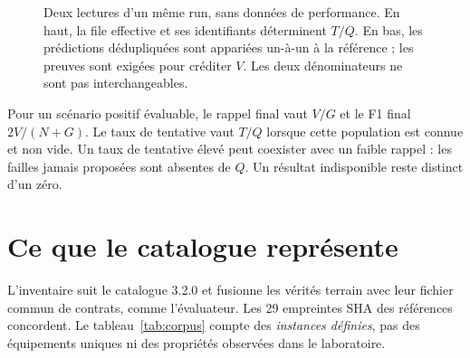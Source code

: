 \documentclass[11pt,a4paper]{article}
\begin{document}
\begin{figure}[htbp]
\centering
{}
\caption{Deux lectures d'un même run, sans données de performance. En haut, la file effective et ses identifiants déterminent $T/Q$. En bas, les prédictions dédupliquées sont appariées un-à-un à la référence ; les preuves sont exigées pour créditer $V$. Les deux dénominateurs ne sont pas interchangeables.}
\label{fig:denominators}
\end{figure}

Pour un scénario positif évaluable, le rappel final vaut $V/G$ et le F1 final $2V/(N+G)$. Le taux de tentative vaut $T/Q$ lorsque cette population est connue et non vide. Un taux de tentative élevé peut coexister avec un faible rappel : les failles jamais proposées sont absentes de $Q$. Un résultat indisponible reste distinct d'un zéro.

\section{Ce que le catalogue représente}
\label{sec:corpus}
L'inventaire suit le catalogue 3.2.0 et fusionne les vérités terrain avec leur fichier commun de contrats, comme l'évaluateur. Les 29 empreintes SHA des références concordent. Le tableau~\ref{tab:corpus} compte des \emph{instances définies}, pas des équipements uniques ni des propriétés observées dans le laboratoire.
\end{document}
